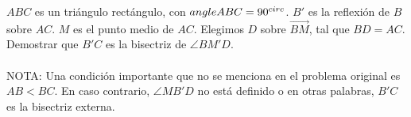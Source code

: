 $ABC$ es un triángulo rectángulo, con $\\angle ABC = 90^{circ}$. $B'$ es la reflexión de $B$ sobre $AC$. $M$ es el punto medio de $AC$. Elegimos $D$ sobre $\overrightarrow{BM}$, tal que $BD = AC$. Demostrar que $B'C$ es la bisectriz de $\angle BM'D$. \\\\
NOTA: Una condición importante que no se menciona en el problema original es $AB<BC$. En caso contrario, $\angle MB'D$ no está definido o en otras palabras, $B'C$ es la bisectriz externa.
